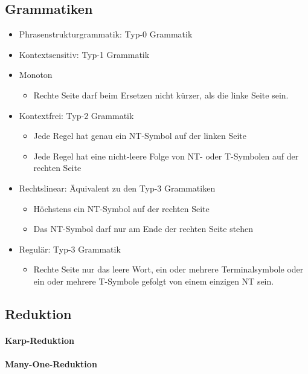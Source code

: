 \documentclass[ngerman]{scrartcl}
\begin{document}
\subsection{Grammatiken}
\begin{itemize}
    \item Phrasenstrukturgrammatik: Typ-0 Grammatik
    \item Kontextsensitiv: Typ-1 Grammatik
    \item Monoton
    \begin{itemize}
        \item Rechte Seite darf beim Ersetzen nicht kürzer, als die linke Seite sein.
    \end{itemize}
    \item Kontextfrei: Typ-2 Grammatik
    \begin{itemize}
        \item Jede Regel hat genau ein NT-Symbol auf der linken Seite
        \item Jede Regel hat eine nicht-leere Folge von NT- oder T-Symbolen auf der rechten Seite
    \end{itemize}
    \item Rechtslinear: Äquivalent zu den Typ-3 Grammatiken 
    \begin{itemize}
        \item Höchstens ein NT-Symbol auf der rechten Seite
        \item Das NT-Symbol darf nur am Ende der rechten Seite stehen
    \end{itemize}
    \item Regulär: Typ-3 Grammatik
    \begin{itemize}
        \item Rechte Seite nur das leere Wort, ein oder mehrere Terminalsymbole oder ein oder mehrere T-Symbole gefolgt von einem einzigen NT sein.
    \end{itemize}
\end{itemize}

\subsection{Reduktion}
\paragraph{Karp-Reduktion}

\paragraph{Many-One-Reduktion}
\end{document}
